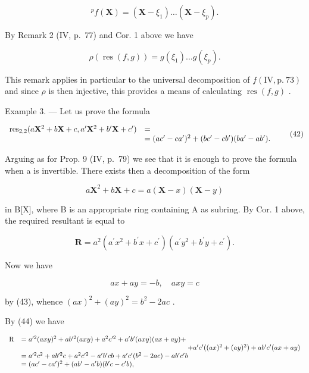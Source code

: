 \[
{ } ^ { p } f ( \mathbf { X } ) = ( \mathbf { X } - \xi _ { 1 } ) \dots ( \mathbf { X } - \xi _ { p } ) .
\]

By Remark 2 (IV, p.~77) and Cor. 1 above we have

\[
\rho (\operatorname{res} (f, g)) = g (\xi_ {1}) \dots g (\xi_ {p}).
\]

This remark applies in particular to the universal decomposition of \(f(\mathrm{IV}, \mathrm{p.~73})\) and since \(\rho\) is then injective, this provides a means of calculating \(\operatorname{res}(f, g)\) .

Example 3. --- Let us prove the formula

\[
\begin{array}{r l} \operatorname{res} _ {2, 2} (a \mathbf {X} ^ {2} + b \mathbf {X} + c, a ^ {\prime} \mathbf {X} ^ {2} + b ^ {\prime} \mathbf {X} + c ^ {\prime}) & = \\ & = (a c ^ {\prime} - c a ^ {\prime}) ^ {2} + (b c ^ {\prime} - c b ^ {\prime}) (b a ^ {\prime} - a b ^ {\prime}). \end{array}\tag{42}
\]

Arguing as for Prop. 9 (IV, p.~79) we see that it is enough to prove the formula when a is invertible. There exists then a decomposition of the form

\[
a \mathbf {X} ^ {2} + b \mathbf {X} + c = a (\mathbf {X} - x) (\mathbf {X} - y)\tag{43}
\]

in B{[}X{]}, where B is an appropriate ring containing A as subring. By Cor. 1 above, the required resultant is equal to

\[
\mathbf {R} = a ^ {2} \left(a ^ {\prime} x ^ {2} + b ^ {\prime} x + c ^ {\prime}\right) \left(a ^ {\prime} y ^ {2} + b ^ {\prime} y + c ^ {\prime}\right).\tag{44}
\]

Now we have

\[
a x + a y = - b, \quad a x y = c
\]

by (43), whence \((ax)^2 + (ay)^2 = b^2 - 2ac\) .

By (44) we have

\[
\begin{array}{r l} \mathrm{R} & = a ^ {\prime 2} (a x y) ^ {2} + a b ^ {\prime 2} (a x y) + a ^ {2} c ^ {\prime 2} + a ^ {\prime} b ^ {\prime} (a x y) (a x + a y) + \\ & \qquad \qquad \qquad \qquad \qquad \qquad \qquad \qquad \qquad \qquad \qquad \qquad + a ^ {\prime} c ^ {\prime} ((a x) ^ {2} + (a y) ^ {2}) + a b ^ {\prime} c ^ {\prime} (a x + a y) \\ & = a ^ {\prime 2} c ^ {2} + a b ^ {\prime 2} c + a ^ {2} c ^ {\prime 2} - a ^ {\prime} b ^ {\prime} c b + a ^ {\prime} c ^ {\prime} (b ^ {2} - 2 a c) - a b ^ {\prime} c ^ {\prime} b \\ & = (a c ^ {\prime} - c a ^ {\prime}) ^ {2} + (a b ^ {\prime} - a ^ {\prime} b) (b ^ {\prime} c - c ^ {\prime} b), \end{array}
\]

